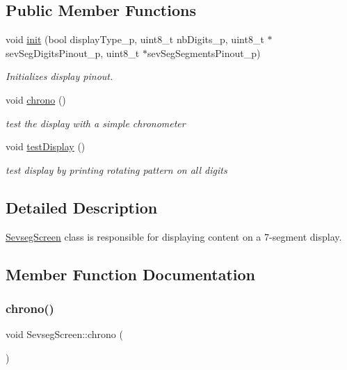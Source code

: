 \subsection*{Public Member Functions}
\begin{DoxyCompactItemize}
\item 
void \hyperlink{class_sevseg_screen_a29e517dc7ddda7547fe8f7c706654444}{init} (bool display\+Type\+\_\+p, uint8\+\_\+t nb\+Digits\+\_\+p, uint8\+\_\+t $\ast$sev\+Seg\+Digits\+Pinout\+\_\+p, uint8\+\_\+t $\ast$sev\+Seg\+Segments\+Pinout\+\_\+p)
\begin{DoxyCompactList}\small\item\em Initializes display pinout. \end{DoxyCompactList}\item 
void \hyperlink{class_sevseg_screen_a3afbaf812d953f552b6d0e80de61804e}{chrono} ()
\begin{DoxyCompactList}\small\item\em test the display with a simple chronometer \end{DoxyCompactList}\item 
void \hyperlink{class_sevseg_screen_ad82130595693d5f18c81c1ca5206da15}{test\+Display} ()
\begin{DoxyCompactList}\small\item\em test display by printing rotating pattern on all digits \end{DoxyCompactList}\end{DoxyCompactItemize}


\subsection{Detailed Description}
\hyperlink{class_sevseg_screen}{Sevseg\+Screen} class is responsible for displaying content on a 7-\/segment display. 

\subsection{Member Function Documentation}
\mbox{\label{class_sevseg_screen_a3afbaf812d953f552b6d0e80de61804e}} 
\subsubsection{\texorpdfstring{chrono()}{chrono()}}
{\footnotesize\ttfamily void Sevseg\+Screen\+::chrono (\begin{DoxyParamCaption}{ }\end{DoxyParamCaption})}



